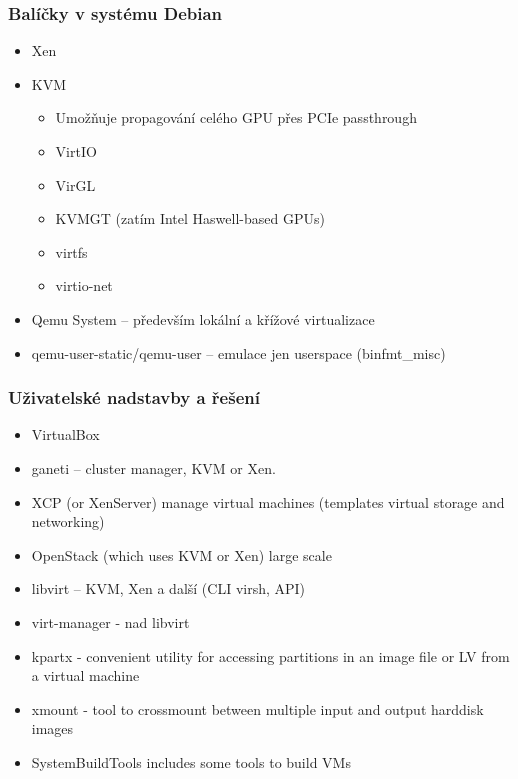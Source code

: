 \documentclass{beamer}
\begin{document}
\begin{frame}
\frametitle{Balíčky v systému Debian}

\begin{itemize}
  \item Xen
  \item KVM
  \begin{itemize}
    \item Umožňuje propagování celého GPU přes PCIe passthrough
    \item VirtIO
    \item VirGL
    \item KVMGT (zatím Intel Haswell-based GPUs)
    \item virtfs
    \item virtio-net
  \end{itemize}
  \item Qemu System -- především lokální a křížové virtualizace
  \item qemu-user-static/qemu-user -- emulace jen userspace (binfmt\_misc)
\end{itemize}
\end{frame}

\begin{frame}
\frametitle{Uživatelské nadstavby a řešení}

\begin{itemize}
  \item VirtualBox
  \item ganeti -- cluster manager, KVM or Xen.
  \item XCP (or XenServer) manage virtual machines (templates virtual storage and networking)
  \item OpenStack (which uses KVM or Xen) large scale
  \item libvirt -- KVM, Xen a další (CLI virsh, API)
  \item virt-manager - nad libvirt
  \item kpartx - convenient utility for accessing partitions in an image file or LV from a virtual machine
  \item xmount - tool to crossmount between multiple input and output harddisk images
  \item SystemBuildTools includes some tools to build VMs
\end{itemize}
\end{frame}
\end{document}
